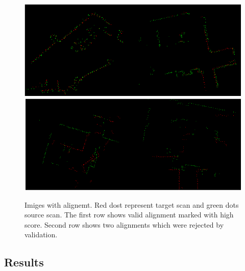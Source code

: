 \begin{figure}
	\centering
	\includegraphics[width=150mm]{../img/good_align.png}
	\includegraphics[width=150mm]{../img/bad_align.png}
	\caption{Imiges with alignemt. Red dost represent target scan and green dots source scan. The first row shows valid alignment marked with high score. Second row shows two alignments which were rejected by validation.}
	\label{fig:bad_align}
\end{figure}
  
\subsection{Results}
\newpage

\newpage
